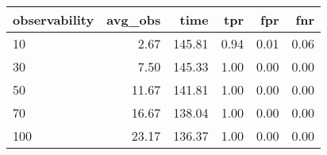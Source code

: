 \begin{tabular}{lrrrrr}
\toprule
observability & avg_obs & time & tpr & fpr & fnr \\
\midrule
10 & 2.67 & 145.81 & 0.94 & 0.01 & 0.06 \\
30 & 7.50 & 145.33 & 1.00 & 0.00 & 0.00 \\
50 & 11.67 & 141.81 & 1.00 & 0.00 & 0.00 \\
70 & 16.67 & 138.04 & 1.00 & 0.00 & 0.00 \\
100 & 23.17 & 136.37 & 1.00 & 0.00 & 0.00 \\
\bottomrule
\end{tabular}
